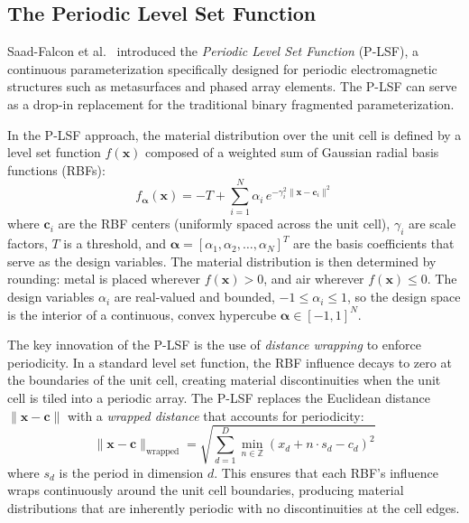 \subsection{The Periodic Level Set Function}

Saad-Falcon et al.\ \cite{SaadFalcon2024LevelSet} introduced the \emph{Periodic Level Set Function} (P-LSF), a continuous parameterization specifically designed for periodic electromagnetic structures such as metasurfaces and phased array elements.  The P-LSF can serve as a drop-in replacement for the traditional binary fragmented parameterization.

In the P-LSF approach, the material distribution over the unit cell is defined by a level set function $f(\mathbf{x})$ composed of a weighted sum of Gaussian radial basis functions (RBFs):
%
\begin{equation}
f_{\boldsymbol{\alpha}}(\mathbf{x}) = -T + \sum_{i=1}^{N} \alpha_i \, e^{-\gamma_i^2 \| \mathbf{x} - \mathbf{c}_i \|^2}
\label{eq:LSF}
\end{equation}
%
where $\mathbf{c}_i$ are the RBF centers (uniformly spaced across the unit cell), $\gamma_i$ are scale factors, $T$ is a threshold, and $\boldsymbol{\alpha} = [\alpha_1, \alpha_2, \ldots, \alpha_N]^T$ are the basis coefficients that serve as the design variables.  The material distribution is then determined by rounding: metal is placed wherever $f(\mathbf{x}) > 0$, and air wherever $f(\mathbf{x}) \leq 0$.  The design variables $\alpha_i$ are real-valued and bounded, $-1 \leq \alpha_i \leq 1$, so the design space is the interior of a continuous, convex hypercube $\boldsymbol{\alpha} \in [-1, 1]^N$.

The key innovation of the P-LSF is the use of \emph{distance wrapping} to enforce periodicity.  In a standard level set function, the RBF influence decays to zero at the boundaries of the unit cell, creating material discontinuities when the unit cell is tiled into a periodic array.  The P-LSF replaces the Euclidean distance $\| \mathbf{x} - \mathbf{c} \|$ with a \emph{wrapped distance} that accounts for periodicity:
%
\begin{equation}
\| \mathbf{x} - \mathbf{c} \|_{\text{wrapped}} = \sqrt{\sum_{d=1}^{D} \min_{n \in \mathbb{Z}} (x_d + n \cdot s_d - c_d)^2}
\label{eq:wrapped}
\end{equation}
%
where $s_d$ is the period in dimension $d$.  This ensures that each RBF's influence wraps continuously around the unit cell boundaries, producing material distributions that are inherently periodic with no discontinuities at the cell edges.

